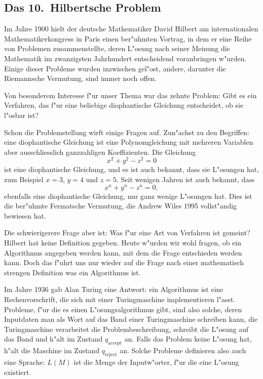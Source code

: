 \subsection{Das 10.~Hilbertsche Problem}
Im Jahre 1900 hielt der deutsche Mathematiker David Hilbert am
internationalen Mathematikerkongress in Paris einen ber"uhmten Vortrag,
in dem er eine Reihe von Problemen zusammenstellte, deren L"osung
nach seiner Meinung die Mathematik im zwanzigsten Jahrhundert
entscheidend voranbringen w"urden. Einige dieser Probleme wurden
inzwischen gel"ost, andere, darunter die Riemannsche Vermutung,
sind immer noch offen.

Von besonderem Interesse f"ur unser Thema war das zehnte Problem:
Gibt es ein Verfahren, das f"ur eine beliebige diophantische Gleichung
entscheidet, ob sie l"osbar ist?

Schon die Problemstellung wirft einige Fragen auf.
Zun"achst zu den Begriffen:
eine diophantische Gleichung ist eine
Polynomgleichung mit mehreren Variablen aber ausschliesslich
ganzzahligen Koeffizienten. Die Gleichung
\[
x^2+y^2-z^2=0
\]
ist eine diophantische Gleichung, und es ist auch bekannt, dass sie
L"osungen hat, zum Beispiel $x=3$, $y=4$ und $z=5$. Seit wenigen
Jahren ist auch bekannt, dass
\[
x^n+y^n-z^n=0,
\]
ebenfalls eine diophantische Gleichung, nur ganz wenige L"osungen hat.
Dies ist die ber"uhmte Fermatsche Vermutung, die Andrew Wiles 1995
vollst"andig bewiesen hat.

Die schwierigerere Frage aber ist: Was f"ur eine Art von Verfahren
ist gemeint? Hilbert hat keine Definition gegeben. Heute w"urden
wir wohl fragen, ob ein Algorithmus angegeben werden kann, mit dem
die Frage entschieden werden kann. Doch das f"uhrt uns nur wieder
auf die Frage nach einer  mathematisch strengen Definition was
ein Algorithmus ist.

Im Jahre 1936 gab Alan Turing eine Antwort: ein Algorithmus ist eine
Rechenvorschrift, die sich mit einer Turingmaschine implementieren
l"asst. Probleme, f"ur die es einen L"osungsalgorithmus gibt, sind
also solche, deren Inputdaten man als Wort auf das Band einer
Turingmaschine schreiben kann, die Turingmaschine verarbeitet die
Problembeschreibung, schreibt die L"osung auf das Band und h"alt im
Zustand $q_{\text{accept}}$ an. Falls das Problem keine L"osung hat,
h"alt die Maschine im Zustand $q_{\text{reject}}$ an. Solche
Probleme definieren also auch eine Sprache: $L(M)$ ist die
Menge der Inputw"orter, f"ur die eine L"osung existiert.

